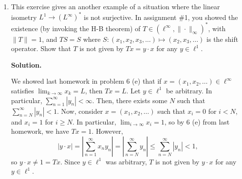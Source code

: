 \documentclass[11pt]{article}
\begin{document}
\begin{enumerate}
We need to show that $g: X \to \R$ is measurable, and $\|g\|_{\infty} < \infty$.
By proposition 2.11 b. in Folland, since $g_n$ is measurable for $n \in \N$, and $g_n \to g$ a.e., $g$ is measurable. 
Now, for $D > C$, we have that
\begin{align*}
    \{x: |g(x)| > D\}  &\subset  \{x:g(x) \neq \lim_{n \to \infty}g_n(x)\} \cup \{x:\lim \sup |g_n(x)| > D\} \\
                    & = \{x:g(x) \neq \lim_{n \to \infty}g_n(x)\} \cup \bigcap_{m = 1}^{\infty} \bigcup_{n = m}^{\infty} \{x: |g_n(x)| > D\} \\
                    &\subset \{x:g(x) \neq \lim_{n \to \infty}g_n(x)\} \cup \bigcup_{n = 1}^{\infty} \{x: |g_n(x)| > D\}
.\end{align*}
But then,
\[
\mu (\{x: |g(x)| > D\} ) \leq \mu(\{x:g(x) \neq \lim_{n \to \infty}g_n(x)\}) +\sum_{n=1}^{\infty} \mu(\{x : |g_n(x)| > D\} ) = 0 + \sum_{n=1}^{\infty} 0
.\] 
Since this applies for all $D > C$, we have that
\[
\inf \{a \geq 0 : \mu(\{x : |g(x)| > a\} ) = 0\}  \leq C
,\] 
as desired. In particular, $\|g\|_{\infty} \leq C$, and $\|g\|_{\infty} < \infty$, so $g \in L^{\infty}$.

\item This exercise gives an another example of a situation where the linear isometry
$L^1 \to (L^\infty)^*$ is not surjective. In assignment \#1, you showed the existence (by invoking
the H-B theorem) of $T\in (\ell^\infty,\|\cdot\|_\infty)^*$, with $\|T\|=1$, and $TS=S$ where
$S:(x_1,x_2,x_3,\ldots)\mapsto (x_2,x_3,\ldots)$ is the shift operator.
Show that $T$ is not given by $Tx=y\cdot x$ for any $y\in \ell^1$.

\textbf{Solution.}

We showed last homework in problem 6 (e) that if $x = (x_1, x_2, \ldots) \in \ell^{\infty}$ satisfies $\lim_{k \to \infty} x_k = L$, then $Tx = L$.
Let $y \in \ell^{1}$ be arbitrary. In particular, $\sum_{n =1 }^{\infty} |y_n| < \infty$.
Then, there exists some $N$ such that $\sum_{n = N}^{\infty} |y_n| < 1$.
Now, consider $x = (x_1, x_2, \ldots)$ such that $x_i = 0$ for $i < N$, and $x_i = 1$ for $i \ge  N$.
In particular, $\lim_{i \to \infty} x_i = 1$, so by 6 (e) from last homework, we have $Tx = 1$.
However, 
\[
|y \cdot x| = \left| \sum_{n = 1}^{\infty} x_n y_n \right| = \left|\sum_{n = N}^{\infty} y_n \right| \leq \sum_{n = N}^{\infty} |y_n| < 1
,\] 
so $y\cdot x \neq 1 = Tx$.
Since $y \in \ell^{1}$ was arbitrary, $T$ is not given by $y \cdot x$ for any $y \in \ell^{1}$.

\end{enumerate}
\end{document}
